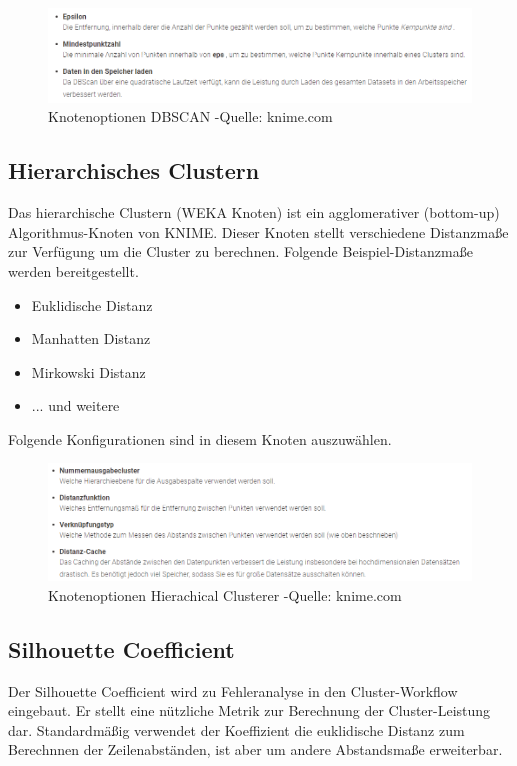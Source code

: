 \documentclass[12pt,					%
							 oneside,			%
							 a4paper,			%
							 halfparskip,		%
							 liststotoc,			%
							 bibtotoc,			%
							 fleqn,				%
							 pointlessnumbers]	%
							 {scrreprt}
\begin{document}
		\begin{figure}[h]
			\begin{center}
				\includegraphics[scale=0.7]{pictures/db-opt.png}
				\caption{Knotenoptionen DBSCAN -Quelle: knime.com}									
			\end{center}
		\end{figure}
		
		\subsection{Hierarchisches Clustern}
		Das hierarchische Clustern (WEKA Knoten) ist ein agglomerativer (bottom-up) Algorithmus-Knoten von KNIME. Dieser Knoten stellt verschiedene Distanzmaße zur Verfügung um die Cluster zu berechnen. Folgende Beispiel-Distanzmaße werden bereitgestellt.
		
		\begin{itemize}
		\item Euklidische Distanz
		\item Manhatten Distanz
		\item Mirkowski Distanz
		\item ... und weitere
		\end{itemize}
		
		Folgende Konfigurationen sind in diesem Knoten auszuwählen.
		\begin{figure}[h]
			\begin{center}
				\includegraphics[scale=0.7]{pictures/hier-opt.png}
				\caption{Knotenoptionen Hierachical Clusterer -Quelle: knime.com}									
			\end{center}
		\end{figure}
		
		\subsection{Silhouette Coefficient}
		Der Silhouette Coefficient wird zu Fehleranalyse in den Cluster-Workflow eingebaut. Er stellt eine nützliche Metrik zur Berechnung der Cluster-Leistung dar. Standardmäßig verwendet der Koeffizient die euklidische Distanz zum Berechnnen der Zeilenabständen, ist aber um andere Abstandsmaße erweiterbar.  \\ \\
\end{document}
